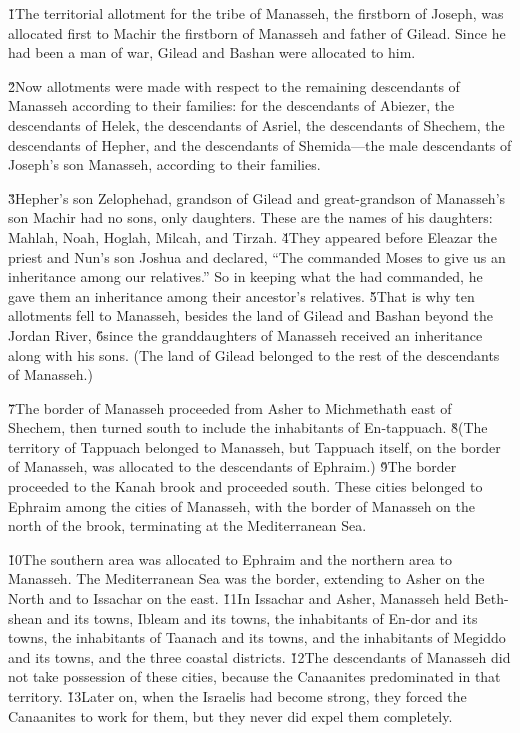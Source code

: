 \v{1}The territorial allotment for the tribe of Manasseh, the firstborn of Joseph, was allocated first to Machir the firstborn of Manasseh and father of Gilead. Since he had been a man of war, Gilead and Bashan were allocated to him.

\v{2}Now allotments were made with respect to the remaining descendants of Manasseh according to their families: for the descendants of Abiezer, the descendants of Helek, the descendants of Asriel, the descendants of Shechem, the descendants of Hepher, and the descendants of Shemida---the male descendants of Joseph's son Manasseh, according to their families.

\v{3}Hepher's son Zelophehad, grandson of Gilead and great-grandson of Manasseh's son Machir had no sons, only daughters. These are the names of his daughters: Mahlah, Noah, Hoglah, Milcah, and Tirzah. \v{4}They appeared before Eleazar the priest and Nun's son Joshua and declared, ``The  commanded Moses to give us an inheritance among our relatives.'' So in keeping what the  had commanded, he gave them an inheritance among their ancestor's relatives. \v{5}That is why ten allotments fell to Manasseh, besides the land of Gilead and Bashan beyond the Jordan River, \v{6}since the granddaughters of Manasseh received an inheritance along with his sons. (The land of Gilead belonged to the rest of the descendants of Manasseh.)

\v{7}The border of Manasseh proceeded from Asher to Michmethath east of Shechem, then turned south to include the inhabitants of En-tappuach. \v{8}(The territory of Tappuach belonged to Manasseh, but Tappuach itself, on the border of Manasseh, was allocated to the descendants of Ephraim.) \v{9}The border proceeded to the Kanah brook and proceeded south. These cities belonged to Ephraim among the cities of Manasseh, with the border of Manasseh on the north of the brook, terminating at the Mediterranean Sea.

\v{10}The southern area was allocated to Ephraim and the northern area to Manasseh. The Mediterranean Sea was the border, extending to Asher on the North and to Issachar on the east. \v{11}In Issachar and Asher, Manasseh held Beth-shean and its towns, Ibleam and its towns, the inhabitants of En-dor and its towns, the inhabitants of Taanach and its towns, and the inhabitants of Megiddo and its towns, and the three coastal districts. \v{12}The descendants of Manasseh did not take possession of these cities, because the Canaanites predominated in that territory. \v{13}Later on, when the Israelis had become strong, they forced the Canaanites to work for them, but they never did expel them completely.

